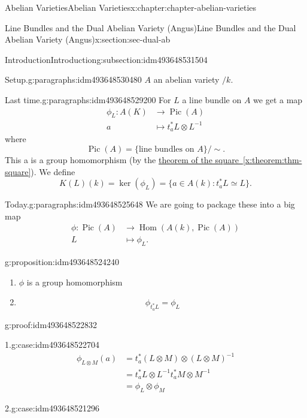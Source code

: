 \documentclass[oneside,10pt,]{book}
\numberwithin{equation}{section}
\DeclareMathOperator{\Hom}{Hom}
\DeclareMathOperator{\Pic}{Pic}
\newcommand{\amp}{&}
\begin{document}
\begin{chapterptx}{Abelian Varieties}{}{Abelian Varieties}{}{}{x:chapter:chapter-abelian-varieties}
\begin{sectionptx}{Line Bundles and the Dual Abelian Variety (Angus)}{}{Line Bundles and the Dual Abelian Variety (Angus)}{}{}{x:section:sec-dual-ab}
\begin{subsectionptx}{Introduction}{}{Introduction}{}{}{g:subsection:idm493648531504}
\begin{paragraphs}{Setup.}{g:paragraphs:idm493648530480}
\(A\) an abelian variety \(/k\).%
\end{paragraphs}%
\begin{paragraphs}{Last time.}{g:paragraphs:idm493648529200}%
For \(L\) a line bundle on \(A\) we get a map%
\begin{align*}
\phi_L\colon A(K) \amp\to \Pic(A)\\
a\amp\mapsto t_a^* L\otimes L^{-1}
\end{align*}
where%
\begin{equation*}
\Pic(A) = \{\text{line bundles on } A\}/\sim\text{.}
\end{equation*}
This a is a group homomorphism (by the \hyperref[x:theorem:thm-square]{theorem of the square~\ref{x:theorem:thm-square}}). We define%
\begin{equation*}
K(L)(k) = \ker(\phi_L) = \{a\in A(k) : t_a^* L \simeq L\}\text{.}
\end{equation*}
%
\end{paragraphs}%
\begin{paragraphs}{Today.}{g:paragraphs:idm493648525648}%
We are going to package these into a big map%
\begin{align*}
\phi\colon \Pic(A)\amp\to \Hom(A(k), \Pic(A))\\
L \amp\mapsto \phi_L\text{.}
\end{align*}
%
\begin{proposition}{}{}{g:proposition:idm493648524240}%
%
\begin{enumerate}
\item{}\(\phi\) is a group homomorphism%
\item{}%
\begin{equation*}
\phi_{t_a^* L}  = \phi_L
\end{equation*}
%
\end{enumerate}
%
\end{proposition}
\begin{proofptx}{}{g:proof:idm493648522832}
\begin{case}{}{1.}{g:case:idm493648522704}
%
\begin{align*}
\phi_{L\otimes M}(a) \amp = t_a^*(L\otimes M) \otimes(L\otimes M)^{-1}\\
\amp = t_a^*L\otimes L^{-1} t_a^*M\otimes M^{-1}\\
\amp = \phi_L\otimes \phi_M
\end{align*}
%
\end{case}
\begin{case}{}{2.}{g:case:idm493648521296}
%
\begin{align*}

\end{align*}
\end{case}
\end{proofptx}
\end{paragraphs}
\end{subsectionptx}
\end{sectionptx}
\end{chapterptx}
\end{document}

